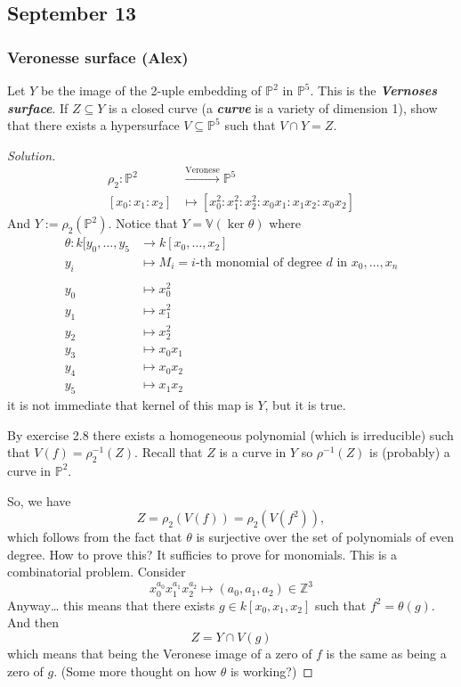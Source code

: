 \subsection{September 13}

\subsubsection{Veronesse surface (Alex)}

\begin{manualexercise}{2.13}
	Let $Y$ be the image of the 2-uple embedding of $\mathbb{P}^2$ in $\mathbb{P}^{5}$. This is the \textit{\textbf{Vernoses surface}}. If $Z\subseteq Y$ is a closed curve (a \textit{\textbf{curve}} is a variety of dimension 1), show that there exists a hypersurface $V\subseteq \mathbb{P}^5$ such that $V \cap Y=Z$.
\end{manualexercise}

\begin{proof}[Solution]\leavevmode
	\begin{align*}
		\rho_2: \mathbb{P}^2 &\overset{\text{Veronese} }{\longrightarrow}\mathbb{P}^5\\
		[x_0:x_1:x_2]&\longmapsto [x_0^2:x_1^2:x_2^2:x_0x_1:x_1x_2:x_0x_2]
	\end{align*}
	And $Y:=\rho_2(\mathbb{P}^2)$. Notice that $Y=\mathbb{V}(\ker \theta)$ where
	\begin{align*}
		\theta: k[y_0,\ldots,y_5 &\longrightarrow k[x_0,\ldots,x_2] \\
		y_i &\longmapsto M_i=\text{$i$-th monomial of degree $d$ in $x_0,\ldots,x_n$}\\ \\
		y_0&\longmapsto x_0^2\\
		y_1&\longmapsto x_1^2\\
		y_2&\longmapsto x_2^2\\
		y_3&\longmapsto x_0x_1\\
		y_4&\longmapsto x_0x_2\\
		y_5&\longmapsto x_1x_2
	\end{align*}
 it is not immediate that kernel of this map is $Y$, but it is true.

 By exercise 2.8 there exists a homogeneous polynomial (which is irreducible) such that $V(f)=\rho^{-1}_2(Z)$. Recall that $Z$ is a curve in $Y$ so $\rho^{-1}(Z)$ is (probably) a curve in $\mathbb{P}^2$.

 So, we have
 \[Z=\rho_2(V(f))=\rho_2(V(f^2)),\]
 which follows from the fact that $\theta$ is surjective over the set of polynomials of even degree. How to prove this? It sufficies to prove for monomials. This is a combinatorial problem. Consider
 \[x_0^{a_0}x_1^{a_1}x_2^{a_2}\longmapsto(a_0,a_1,a_2)\in\mathbb{Z}^3\]
 Anyway… this means that there exists $g\in k[x_0,x_1,x_2]$ such that $f^2=\theta(g)$. And then
 \[Z=Y\cap V(g)\]
 which means that being the Veronese image of a zero of $f$ is the same as being a zero of $g$. (Some more thought on how $\theta$ is working?)
\end{proof}

